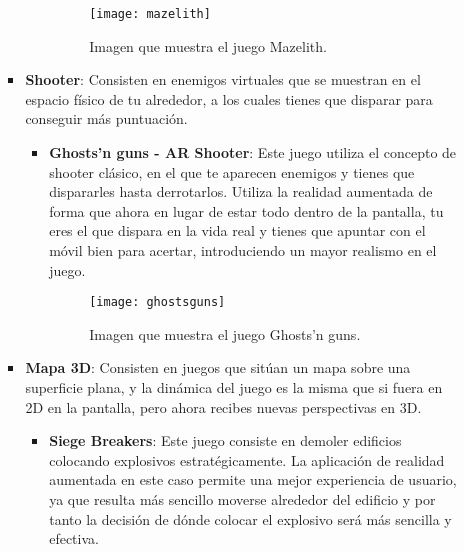 \begin{itemize}
\begin{itemize}
\begin{itemize}
\begin{itemize}
    \begin{figure}[h]
      \centering
      \texttt{[image: mazelith]}
      \caption{Imagen que muestra el juego Mazelith.\protect\footnotemark}
      \label{figura-mazelith}
    \end{figure}

  \end{itemize}

  \item \textbf{Shooter}: Consisten en enemigos virtuales que se muestran en el espacio físico de tu alrededor, a los cuales tienes que disparar para conseguir más puntuación.

  \begin{itemize}
    \item \textbf{Ghosts’n guns - AR Shooter}: Este juego utiliza el concepto de shooter clásico, en el que te aparecen enemigos y tienes que dispararles hasta derrotarlos. Utiliza la realidad aumentada de forma que ahora en lugar de estar todo dentro de la pantalla, tu eres el que dispara en la vida real y tienes que apuntar con el móvil bien para acertar, introduciendo un mayor realismo en el juego.

    \begin{figure}[h]
      \centering
      \texttt{[image: ghostsguns]}
      \caption{Imagen que muestra el juego Ghosts'n guns.\protect\footnotemark}
      \label{figura-ghosts-guns}
    \end{figure}

  \end{itemize}

  \item \textbf{Mapa 3D}: Consisten en juegos que sitúan un mapa sobre una superficie plana, y la dinámica del juego es la misma que si fuera en 2D en la pantalla, pero ahora recibes nuevas perspectivas en 3D.

  \begin{itemize}
    \item \textbf{Siege Breakers}: Este juego consiste en demoler edificios colocando explosivos estratégicamente. La aplicación de realidad aumentada en este caso permite una mejor experiencia de usuario, ya que resulta más sencillo moverse alrededor del edificio y por tanto la decisión de dónde colocar el explosivo será más sencilla y efectiva.


\end{itemize}
\end{itemize}
\end{itemize}
\end{itemize}
